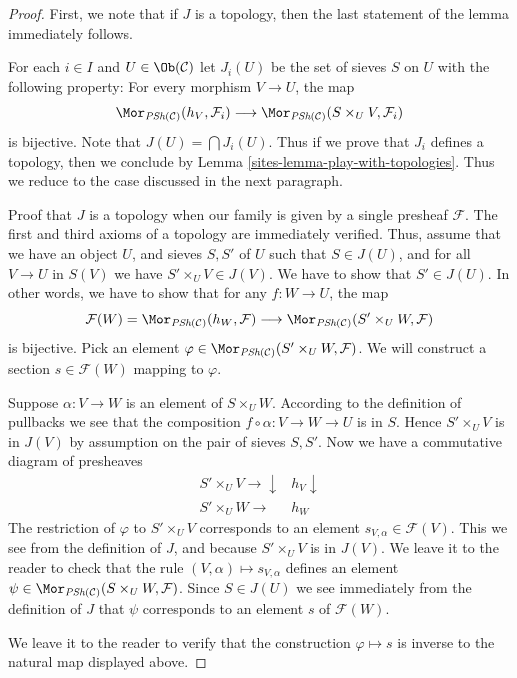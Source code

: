 \begin{proof}

First, we note that if $J$ is a topology, then the last statement of
the lemma immediately follows.

\medskip\noindent
For each $i \in I$ and $U \in \Ob(\mathcal{C})$ let $J_i(U)$
be the set of sieves $S$ on $U$ with the following property:
For every morphism $V \to U$, the map
$$
\Mor_{\textit{PSh}(\mathcal{C})}(h_V, \mathcal{F}_i)
\longrightarrow
\Mor_{\textit{PSh}(\mathcal{C})}(S \times_U V, \mathcal{F}_i)
$$
is bijective. Note that $J(U) = \bigcap J_i(U)$. Thus if we prove
that $J_i$ defines a topology, then we conclude by
Lemma \ref{sites-lemma-play-with-topologies}.
Thus we reduce to the case discussed in the next paragraph.

\medskip\noindent
Proof that $J$ is a topology when our family is given by a single
presheaf $\mathcal{F}$. The first and third axioms of
a topology are immediately verified. Thus, assume that
we have an object $U$, and sieves $S, S'$ of $U$
such that $S \in J(U)$, and for all $V \to U$ in $S(V)$
we have $S' \times_U V \in J(V)$. We have to show that
$S' \in J(U)$. In other words, we have to show that for
any $f : W \to U$, the map
$$
\mathcal{F}(W) =
\Mor_{\textit{PSh}(\mathcal{C})}(h_W, \mathcal{F})
\longrightarrow
\Mor_{\textit{PSh}(\mathcal{C})}(S' \times_U W, \mathcal{F})
$$
is bijective. Pick an element $\varphi \in
\Mor_{\textit{PSh}(\mathcal{C})}(S' \times_U W, \mathcal{F})$.
We will construct a section $s \in \mathcal{F}(W)$
mapping to $\varphi$.

\medskip\noindent
Suppose $\alpha : V \to W$ is an element of $S \times_U W$.
According to the definition of pullbacks we see that
the composition $f \circ \alpha : V \to W  \to U$ is in $S$. Hence
$S' \times_U V$ is in $J(V)$ by assumption on the pair
of sieves $S, S'$. Now we have a commutative diagram
of presheaves
$$
\begin{array}{cc}S' \times_U V \longrightarrow\downarrow & h_V \downarrow \\ S' \times_U W \longrightarrow & h_W\end{array}
$$
The restriction of $\varphi$ to $S' \times_U V$
corresponds to an element $s_{V, \alpha} \in \mathcal{F}(V)$.
This we see from the definition of $J$,
and because $S' \times_U V$ is in $J(V)$.
We leave it to the reader to check
that the rule $(V, \alpha) \mapsto s_{V, \alpha}$ defines
an element
$\psi \in
\Mor_{\textit{PSh}(\mathcal{C})}(S \times_U W, \mathcal{F})$.
Since $S \in J(U)$ we see immediately from the definition of $J$
that $\psi$ corresponds to an element $s$ of $\mathcal{F}(W)$.

\medskip\noindent
We leave it to the reader to verify that the construction
$\varphi \mapsto s$ is inverse to the natural map displayed above.
\end{proof}


